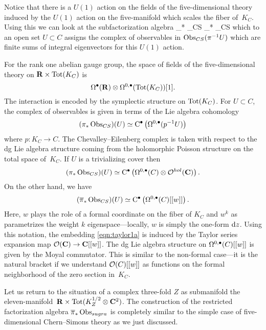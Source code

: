 Notice that there is a $U(1)$ action on the fields of the five-dimensional theory induced by the $U(1)$ action on the five-manifold which scales the fiber of~$K_C$.
Using this we can look at the subfactorization algebra 
\beqn\label{eqn:taylor1a}
\Bar{\pi}_* \Obs_{CS} \subset \pi_* \Obs_{CS}
\eeqn
which to an open set $U \subset C$ assigns the complex of observables in $\operatorname{Obs}_{CS} (\pi^{-1} U)$ which are finite sums of integral eigenvectors for this $U(1)$ action.

For the rank one abelian gauge group, the space of fields of the five-dimensional theory on $\mathbf{R} \times {\rm Tot}(K_C)$ is
\[
\Omega^\bullet(\mathbf{R}) \otimes \Omega^{0,\bullet}({\rm Tot}(K_C)) [1] .
\]
The interaction is encoded by the symplectic structure on ${\rm Tot}(K_C)$.
For $U \subset C$, the complex of observables is given in terms of the Lie algebra cohomology
\[
(\pi_* \operatorname{Obs}_{CS})(U) \simeq {\rm C}^\bullet \left(\Omega^{0,\bullet}(p^{-1}U)\right)
\]
where $p \colon K_C \to C$.
The Chevalley--Eilenberg complex is taken with respect to the dg Lie algebra structure coming from the holomorphic Poisson structure on the total space of~$K_C$. 
If $U$ is a trivializing cover then
\[
(\pi_* \operatorname{Obs}_{CS})(U) \simeq {\rm C}^\bullet \left(\Omega^{0,\bullet}(C) \otimes \mathcal O^{hol}(\mathbf{C})\right) .
\]
On the other hand, we have
\[
(\overline{\pi}_* \operatorname{Obs}_{CS})(U) \simeq {\rm C}^\bullet\left(\Omega^{0,\bullet}(C) [[w]] \right) .
\]
Here, $w$ plays the role of a formal coordinate on the fiber of $K_C$ and $w^{k}$ as parametrizes the weight $k$ eigenspace---locally, $w$ is simply the one-form ${\rm d} z$.
Using this notation, the embedding \eqref{eqn:taylor1a} is induced by the Taylor series expansion map $\mathcal O(\mathbf{C}) \to \mathbf{C}[[w]]$.
The dg Lie algebra structure on $\Omega^{0,\bullet}(C) [[w]]$ is given by the Moyal commutator. 
This is similar to the non-formal case---it is the natural bracket if we understand $\mathcal O(C)[[w]]$ as functions on the formal neighborhood of the zero section in~$K_C$.


\parsec[]

Let us return to the situation of a complex three-fold $Z$ as submanifold the eleven-manifold~$\mathbf{R} \times \text{Tot}(K_{Z}^{1/2} \otimes \mathbf{C}^2)$. 
The construction of the restricted factorization algebra $\overline{\pi}_* \operatorname{Obs}_{sugra}$ is completely similar to the simple case of five-dimensional Chern--Simons theory as we just discussed.

